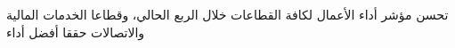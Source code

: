 تحسن مؤشر أداء الأعمال لكافة القطاعات خلال الربع الحالي، وقطاعا الخدمات المالية والاتصالات حققا أفضل أداء
